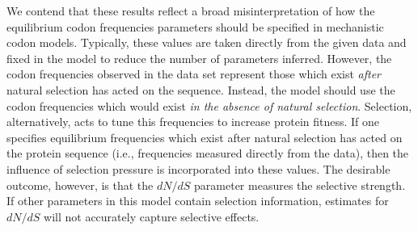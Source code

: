 \documentclass[11pt]{article}
\begin{document}
We contend that these results reflect a broad misinterpretation of how the equilibrium codon frequencies parameters should be specified in mechanistic codon models. Typically, these values are taken directly from the given data and fixed in the model to reduce the number of parameters inferred. However, the codon frequencies observed in the data set represent those which exist \textit{after} natural selection has acted on the sequence. Instead, the model should use the codon frequencies which would exist \textit{in the absence of natural selection}. Selection, alternatively, acts to tune this frequencies to increase protein fitness. If one specifies equilibrium frequencies which exist after natural selection has acted on the protein sequence (i.e., frequencies measured directly from the data), then the influence of selection pressure is incorporated into these values. The desirable outcome, however, is that the $dN/dS$ parameter measures the selective strength. If other parameters in this model contain selection information, estimates for $dN/dS$ will not accurately capture selective effects.



\end{document}

